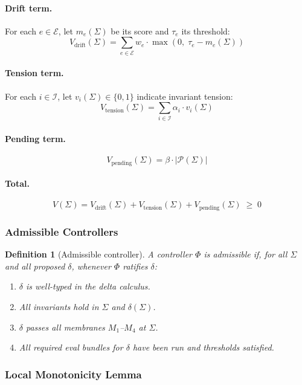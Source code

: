 \documentclass[11pt]{article}
\newtheorem{definition}{Definition}[section]
\begin{document}
\paragraph{Drift term.}
For each $e \in \mathcal{E}$, let $m_e(\Sigma)$ be its score
and $\tau_e$ its threshold:
\[
  V_{\mathrm{drift}}(\Sigma)
  = \sum_{e \in \mathcal{E}} w_e \cdot \max(0,\; \tau_e - m_e(\Sigma))
\]

\paragraph{Tension term.}
For each $i \in \mathcal{I}$, let $v_i(\Sigma) \in \{0,1\}$
indicate invariant tension:
\[
  V_{\mathrm{tension}}(\Sigma)
  = \sum_{i \in \mathcal{I}} \alpha_i \cdot v_i(\Sigma)
\]

\paragraph{Pending term.}
\[
  V_{\mathrm{pending}}(\Sigma)
  = \beta \cdot |\mathcal{P}(\Sigma)|
\]

\paragraph{Total.}
\[
  V(\Sigma)
  = V_{\mathrm{drift}}(\Sigma)
  + V_{\mathrm{tension}}(\Sigma)
  + V_{\mathrm{pending}}(\Sigma)
  \;\geq\; 0
\]

\subsubsection{Admissible Controllers}

\begin{definition}[Admissible controller]
\label{def:admissible}
A controller $\Phi$ is \emph{admissible} if, for all $\Sigma$
and all proposed $\delta$, whenever $\Phi$ ratifies $\delta$:
\begin{enumerate}
  \item $\delta$ is well-typed in the delta calculus.
  \item All invariants hold in $\Sigma$ and $\delta(\Sigma)$.
  \item $\delta$ passes all membranes $M_1$--$M_4$ at $\Sigma$.
  \item All required eval bundles for $\delta$ have been run and
    thresholds satisfied.
\end{enumerate}
\end{definition}

\subsubsection{Local Monotonicity Lemma}
\end{document}
